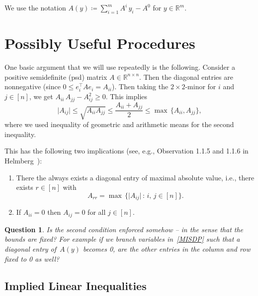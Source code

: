 \documentclass[10pt, a4paper]{article}
\newcommand{\suchthat}{\,:\,}
\newcommand{\abs}[1]{\lvert{#1}\rvert}
\newcommand{\define}{\coloneqq}
\newcommand{\T}{^{\top}}
\newcommand{\R}{\mathds{R}}
\newtheorem{question}[theorem]{Question}
\begin{document}
We use the notation $A(y) \define \sum_{i=1}^m A^i\, y_i - A^0$ for $y \in \R^m$.


\section{Possibly Useful Procedures}

One basic argument that we will use repeatedly is the following. Consider a
positive semidefinite (psd) matrix $A \in \R^{n \times n}$. Then the
diagonal entries are nonnegative (since $0 \leq e_i\T A e_i =
A_{ii}$). Then taking the $2 \times 2$-minor for $i$ and $j \in [n]$, we
get $A_{ii}\, A_{jj} - A_{ij}^2 \geq 0$. This implies
\begin{equation}\label{eq:TwoByTwoMinorInequality}
  \abs{A_{ij}} \leq \sqrt{A_{ii} A_{jj}} \leq \frac{A_{ii} + A_{jj}}{2} \leq \max\,\{A_{ii},
  A_{jj}\},
\end{equation}
where we used inequality of geometric and arithmetic means for the second inequality.

This has the following two implications (see, e.g., Observation 1.1.5 and
1.1.6 in Helmberg~\cite{Hel00}):
\begin{enumerate}
\item There the always exists a diagonal entry of maximal absolute value,
  i.e., there exists $r \in [n]$ with
  \[
    A_{rr} = \max\, \{\abs{A_{ij}} \suchthat i,\,j \in [n]\}.
  \]
\item If $A_{ii} = 0$ then $A_{ij} = 0$ for all $j \in [n]$.
\end{enumerate}

\begin{question}
  Is the second condition enforced somehow -- in the sense that the bounds
  are fixed? For example if we branch variables in~\eqref{MISDP} such that
  a diagonal entry of~$A(y)$ becomes 0, are the other entries in the column and row
  fixed to 0 as well?
\end{question}


\subsection{Implied Linear Inequalities}\label{sec:ImpliedLinEqs}
\end{document}
